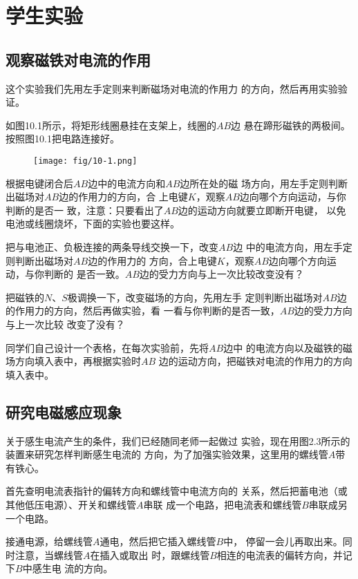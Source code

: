 \chapter{学生实验}

\section{观察磁铁对电流的作用}

这个实验我们先用左手定则来判断磁场对电流的作用力
的方向，然后再用实验验证。

如图10.1所示，将矩形线圈悬挂在支架上，线圈的$AB$边
悬在蹄形磁铁的两极间。按照图10.1把电路连接好。
\begin{figure}[htp]\centering
    \texttt{[image: fig/10-1.png]}
    \caption{}
    \end{figure}

根据电键闭合后$AB$边中的电流方向和$AB$边所在处的磁
场方向，用左手定则判断出磁场对$AB$边的作用力的方向，合
上电键$K$，观察$AB$边向哪个方向运动，与你判断的是否一
致，注意：只要看出了$AB$边的运动方向就要立即断开电键，
以免电池或线圈烧坏，下面的实验也要这样。

把与电池正、负极连接的两条导线交换一下，改变$AB$边
中的电流方向，用左手定则判断出磁场对$AB$边的作用力的
方向，合上电键$K$，观察$AB$边向哪个方向运动，与你判断的
是否一致。$AB$边的受力方向与上一次比较改变没有？

把磁铁的$N$、$S$极调换一下，改变磁场的方向，先用左手
定则判断出磁场对$AB$边的作用力的方向，然后再做实验，看
一看与你判断的是否一致，$AB$边的受力方向与上一次比较
改变了没有？

同学们自己设计一个表格，在每次实验前，先将$AB$边中
的电流方向以及磁铁的磁场方向填入表中，再根据实验时$AB$
边的运动方向，把磁铁对电流的作用力的方向填入表中。

\section{研究电磁感应现象}

关于感生电流产生的条件，我们已经随同老师一起做过
实验，现在用图2.3所示的装置来研究怎样判断感生电流的
方向，为了加强实验效果，这里用的螺线管$A$带有铁心。

首先查明电流表指针的偏转方向和螺线管中电流方向的
关系，然后把蓄电池（或其他低压电源）、开关和螺线管$A$串联
成一个电路，把电流表和螺线管$B$串联成另一个电路。

接通电源，给螺线管$A$通电，然后把它插入螺线管$B$中，
停留一会儿再取出来。同时注意，当螺线管$A$在插入或取出
时，跟螺线管$B$相连的电流表的偏转方向，并记下$B$中感生电
流的方向。

